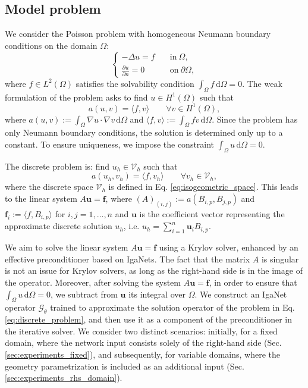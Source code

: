 \documentclass{article}
\theoremstyle{plain}
\numberwithin{equation}{section}
\begin{document}
\subsection{Model problem}\label{sec:model_problem}
We consider the Poisson problem with homogeneous Neumann boundary conditions on the domain $\Omega$:
\begin{equation}
    \begin{cases}
        -\Delta u = f \quad               & \text{in} \ \Omega,         \\
        \frac{\partial u}{\partial n} = 0 & \text{on}\ \partial \Omega,
    \end{cases}
    \label{eq:poisson_strong}
\end{equation}
where $f \in L^2(\Omega)$ satisfies the solvability condition $\int_{\Omega} f \, \mathrm{d}\Omega = 0$.
The weak formulation of the problem asks to find $u \in H^1(\Omega)$ such that
\begin{equation}
    a(u,v) = \langle f, v \rangle \qquad  \forall v \in H^1(\Omega),
    \label{eq:weak_form}
\end{equation}
where $a(u,v) := \int_{\Omega} \nabla u \cdot \nabla v \, \mathrm{d}\Omega$ and $\langle f, v \rangle := \int_{\Omega} f v \, \mathrm{d}\Omega$.
Since the problem has only Neumann boundary conditions, the solution is determined only up to a constant. To ensure uniqueness, we impose the constraint $\int_{\Omega} u \, \mathrm{d}\Omega = 0$.

The discrete problem is: find $u_h \in \mathcal{V}_h$ such that
\begin{equation}
    a(u_h, v_h) = \langle f, v_h \rangle \qquad  \forall v_h \in \mathcal{V}_h,
    \label{eq:discrete_problem}
\end{equation}
where the discrete space $\mathcal{V}_h$ is defined in Eq. \eqref{eq:isogeometric_space}.
This leads to the linear system $A\mathbf{u} = \mathbf{f}$, where $(A)_{(i,j)}:=a(B_{i,p},B_{j,p})$ and $\mathbf{f}_{i}:= \langle f, B_{i,p} \rangle$ for $i,j=1,\dots,n$  and $\mathbf{u}$ is  the coefficient vector representing the approximate discrete solution $u_h$, i.e. $u_h = \sum_{i=1}^n \mathbf{u}_i B_{i,p}$.

We aim to solve the linear system $A\mathbf{u} = \mathbf{f}$ using a Krylov solver, enhanced by an effective preconditioner based on IgaNets.
The fact that the matrix $A$ is singular is not an issue for Krylov solvers, as long as the right-hand side is in the image of the operator. Moreover, after solving the system $A\mathbf{u} = \mathbf{f}$, in order to ensure that $\int_{\Omega} u \, \mathrm{d}\Omega = 0$, we subtract from $\mathbf{u}$ its integral over $\Omega$.
We construct an IgaNet operator $\mathcal{G}_{\theta}$  
trained to approximate the solution operator of the problem in Eq. \eqref{eq:discrete_problem}, and then use it as a component of the preconditioner in the iterative solver.
We consider two distinct scenarios: initially, for a fixed domain, where the network input consists solely of the right-hand side (Sec. \ref{sec:experiments_fixed}), and subsequently, for variable domains, where the geometry parametrization is included as an additional input (Sec. \ref{sec:experiments_rhs_domain}).
\end{document}

